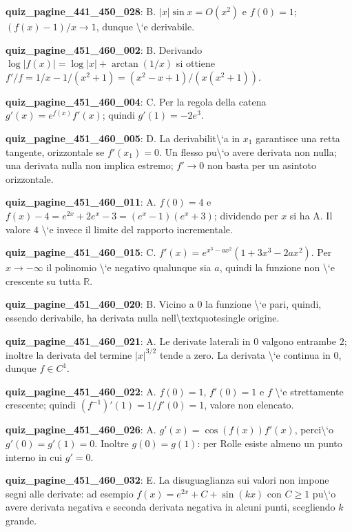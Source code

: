 \documentclass[11pt,a4paper]{article}
\newcounter{quiz}
\begin{document}
\noindent\textbf{quiz\_pagine\_441\_450\_028}: B. $|x|\sin x=O(x^2)$ e $f(0)=1$; $(f(x)-1)/x\to1$, dunque \textbackslash{}`e derivabile.\par\medskip
\noindent\textbf{quiz\_pagine\_451\_460\_002}: B. Derivando $\log|f(x)|=\log|x|+\arctan(1/x)$ si ottiene $f\prime/f=1/x-1/(x^2+1)=(x^2-x+1)/(x(x^2+1))$.\par\medskip
\noindent\textbf{quiz\_pagine\_451\_460\_004}: C. Per la regola della catena $g\prime(x)=e^{f(x)}f\prime(x)$; quindi $g\prime(1)=-2e^3$.\par\medskip
\noindent\textbf{quiz\_pagine\_451\_460\_005}: D. La derivabilit\textbackslash{}`a in $x_1$ garantisce una retta tangente, orizzontale se $f\prime(x_1)=0$. Un flesso pu\textbackslash{}`o avere derivata non nulla; una derivata nulla non implica estremo; $f\prime\to0$ non basta per un asintoto orizzontale.\par\medskip
\noindent\textbf{quiz\_pagine\_451\_460\_011}: A. $f(0)=4$ e $f(x)-4=e^{2x}+2e^x-3=(e^x-1)(e^x+3)$; dividendo per $x$ si ha A. Il valore $4$ \textbackslash{}`e invece il limite del rapporto incrementale.\par\medskip
\noindent\textbf{quiz\_pagine\_451\_460\_015}: C. $f\prime(x)=e^{x^3-ax^2}(1+3x^3-2ax^2)$. Per $x\to-\infty$ il polinomio \textbackslash{}`e negativo qualunque sia $a$, quindi la funzione non \textbackslash{}`e crescente su tutta $\mathbb R$.\par\medskip
\noindent\textbf{quiz\_pagine\_451\_460\_020}: B. Vicino a $0$ la funzione \textbackslash{}`e pari, quindi, essendo derivabile, ha derivata nulla nell\textbackslash{}textquotesingle origine.\par\medskip
\noindent\textbf{quiz\_pagine\_451\_460\_021}: A. Le derivate laterali in $0$ valgono entrambe $2$; inoltre la derivata del termine $|x|^{3/2}$ tende a zero. La derivata \textbackslash{}`e continua in $0$, dunque $f\in C^1$.\par\medskip
\noindent\textbf{quiz\_pagine\_451\_460\_022}: A. $f(0)=1$, $f\prime(0)=1$ e $f$ \textbackslash{}`e strettamente crescente; quindi $(f^{-1})\prime(1)=1/f\prime(0)=1$, valore non elencato.\par\medskip
\noindent\textbf{quiz\_pagine\_451\_460\_026}: A. $g\prime(x)=\cos(f(x))f\prime(x)$, perci\textbackslash{}`o $g\prime(0)=g\prime(1)=0$. Inoltre $g(0)=g(1)$: per Rolle esiste almeno un punto interno in cui $g\prime=0$.\par\medskip
\noindent\textbf{quiz\_pagine\_451\_460\_032}: E. La disuguaglianza sui valori non impone segni alle derivate: ad esempio $f(x)=e^{2x}+C+\sin(kx)$ con $C\ge1$ pu\textbackslash{}`o avere derivata negativa e seconda derivata negativa in alcuni punti, scegliendo $k$ grande.\par\medskip
\end{document}
